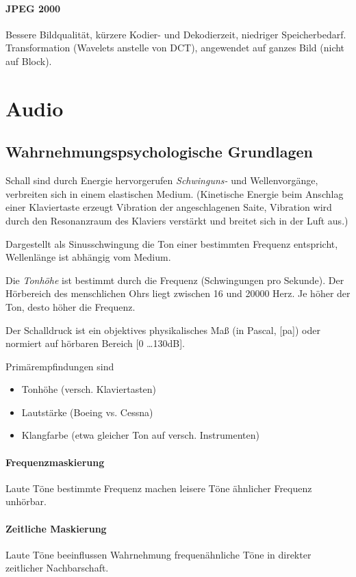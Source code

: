 \documentclass[twocolumn]{article}
\begin{document}
\paragraph{JPEG 2000} Bessere Bildqualität, kürzere Kodier- und Dekodierzeit, niedriger Speicherbedarf. Transformation (Wavelets anstelle von DCT), angewendet auf ganzes Bild (nicht auf Block).

\section{Audio}

\subsection{Wahrnehmungspsychologische Grundlagen}

Schall sind durch Energie hervorgerufen \emph{Schwinguns-} und Wellenvorgänge, verbreiten sich in einem elastischen Medium. (Kinetische Energie beim Anschlag einer Klaviertaste erzeugt Vibration der angeschlagenen Saite, Vibration wird durch den Resonanzraum des Klaviers verstärkt und breitet sich in der Luft aus.)

Dargestellt als Sinusschwingung die Ton einer bestimmten Frequenz entspricht, Wellenlänge ist abhängig vom Medium.

Die \emph{Tonhöhe} ist bestimmt durch die Frequenz (Schwingungen pro Sekunde). Der Hörbereich des menschlichen Ohrs liegt zwischen 16 und 20000 Herz. Je höher der Ton, desto höher die Frequenz.

Der Schalldruck ist ein objektives physikalisches Maß (in Pascal, [pa]) oder normiert auf hörbaren Bereich [0 \ldots 130dB].

Primärempfindungen sind
\begin{itemize}
    \item Tonhöhe (versch. Klaviertasten)
    \item Lautstärke (Boeing vs. Cessna)
    \item Klangfarbe (etwa gleicher Ton auf versch. Instrumenten)
\end{itemize}

\paragraph{Frequenzmaskierung} Laute Töne bestimmte Frequenz machen leisere Töne ähnlicher Frequenz unhörbar.

\paragraph{Zeitliche Maskierung} Laute Töne beeinflussen Wahrnehmung frequenähnliche Töne in direkter zeitlicher Nachbarschaft.
\end{document}
